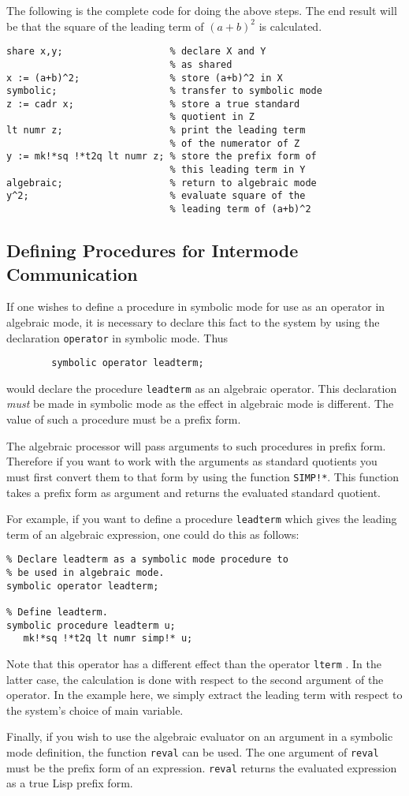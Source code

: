 The following is the complete code for doing the above steps. The end
result will be that the square of the leading term of $(a+b)^{2}$ is
calculated.

\begin{verbatim}
share x,y;                   % declare X and Y
                             % as shared
x := (a+b)^2;                % store (a+b)^2 in X
symbolic;                    % transfer to symbolic mode
z := cadr x;                 % store a true standard
                             % quotient in Z
lt numr z;                   % print the leading term
                             % of the numerator of Z
y := mk!*sq !*t2q lt numr z; % store the prefix form of
                             % this leading term in Y
algebraic;                   % return to algebraic mode
y^2;                         % evaluate square of the
                             % leading term of (a+b)^2
\end{verbatim}

\subsection{Defining Procedures for Intermode Communication}

If one wishes to define a procedure in symbolic mode for use as an
operator in algebraic mode, it is necessary to declare this fact to the
system by using the declaration \texttt{operator} in
symbolic mode. Thus
\begin{verbatim}
        symbolic operator leadterm;
\end{verbatim}
would declare the procedure \texttt{leadterm} as an algebraic operator. This
declaration \emph{must} be made in symbolic mode as the effect in algebraic
mode is different.  The value of such a procedure must be a prefix form.

The algebraic processor will pass arguments to such procedures in prefix
form. Therefore if you want to work with the arguments as standard
quotients you must first convert them to that form by using the function
\texttt{SIMP!*}. This function takes a prefix form as argument and returns the
evaluated standard quotient.

For example, if you want to define a procedure \texttt{leadterm} which gives the
leading term of an algebraic expression, one could do this as follows:
\begin{samepage}
\begin{verbatim}
% Declare leadterm as a symbolic mode procedure to
% be used in algebraic mode.
symbolic operator leadterm; 

% Define leadterm.
symbolic procedure leadterm u;
   mk!*sq !*t2q lt numr simp!* u;
\end{verbatim}
\end{samepage}
Note that this operator has a different effect than the operator \texttt{lterm}
.  In the latter case, the calculation is done
with respect to the second argument of the operator.  In the example here,
we simply extract the leading term with respect to the system's choice of
main variable.

Finally, if you wish to use the algebraic evaluator on an argument in a
symbolic mode definition, the function \texttt{reval} can be used.  The one
argument of \texttt{reval} must be the prefix form of an expression.
\texttt{reval} returns the evaluated expression as a true Lisp prefix form.
